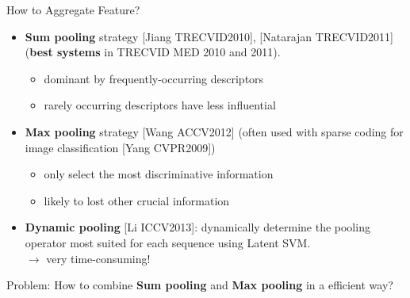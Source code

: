 \documentclass{beamer}
\begin{document}
\begin{frame}[t]{How to Aggregate Feature?}
	\begin{itemize}
		\item \textbf{Sum pooling} strategy [Jiang TRECVID2010], [Natarajan TRECVID2011] (\textbf{best systems} in TRECVID MED 2010 and 2011).
		\begin{itemize}
\item dominant by frequently-occurring descriptors
\item rarely occurring descriptors have less influential
		\end{itemize}	
		
		\item \textbf{Max pooling} strategy [Wang ACCV2012] (often used with sparse coding for image classification [Yang CVPR2009])
				\begin{itemize}
					\item only select the most discriminative information
					\item likely to lost other crucial information
				\end{itemize}	
		\item \textbf{Dynamic pooling} [Li ICCV2013]: dynamically
		determine the pooling operator most suited for each
		sequence using Latent SVM. \\
		$\rightarrow$ very time-consuming!
			
	\end{itemize}
	Problem: How to combine \textbf{Sum pooling} and \textbf{Max pooling} in a efficient way?


\end{frame}
\end{document}
